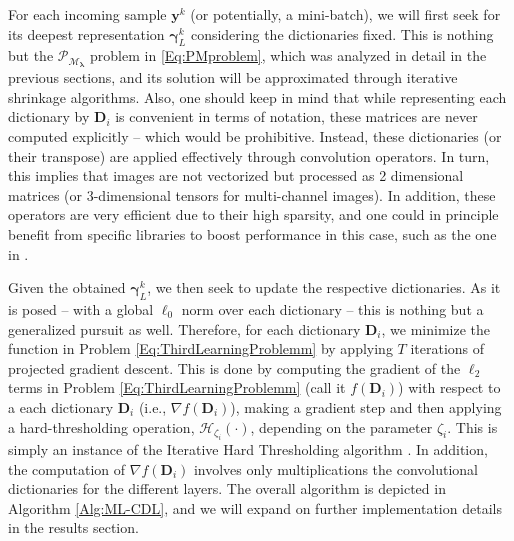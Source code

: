 \documentclass[10pt,journal]{IEEEtran}
\def\y{{\mathbf y}}
\def\D{{\mathbf D}}
\def\M{{\mathcal{M}}}
\def\P{{\mathcal{P}}}
\def\S{{\mathcal{S}}}
\def\gama{{\boldsymbol \gamma}}
\def\lamda{{\boldsymbol \lambda}}
\def\PM{{\P_{\M_\lamda}}}
\theoremstyle{plain}
\theoremstyle{definition}
\begin{document}
For each incoming sample $\y^k$ (or potentially, a mini-batch), we will first seek for its deepest representation $\gama^k_L$ considering the dictionaries fixed. This is nothing but the $\PM$ problem in \eqref{Eq:PMproblem}, which was analyzed in detail in the previous sections, and its solution will be approximated through iterative shrinkage algorithms. Also, one should keep in mind that while representing each dictionary by $\D_i$ is convenient in terms of notation, these matrices are never computed explicitly -- which would be prohibitive. Instead, these dictionaries (or their transpose) are applied effectively through convolution operators. In turn, this implies that images are not vectorized but processed as 2 dimensional matrices (or 3-dimensional tensors for multi-channel images). In addition, these operators are very efficient due to their high sparsity, and one could in principle benefit from specific libraries to boost performance in this case, such as the one in \cite{liu2015sparse}.

Given the obtained $\gama^k_L$, we then seek to update the respective dictionaries. As it is posed -- with a global $\ell_0$ norm over each dictionary -- this is nothing but a generalized pursuit as well. Therefore, for each dictionary $\D_i$, we minimize the function in Problem \eqref{Eq:ThirdLearningProblemm} by applying $T$ iterations of projected gradient descent. 
This is done by computing the gradient of the $\ell_2$ terms in Problem \eqref{Eq:ThirdLearningProblemm} (call it $f(\D_i)$) with respect to a each dictionary $\D_i$ (i.e., $\nabla f(\D_i)$), making a gradient step and then applying a hard-thresholding operation, $\mathcal{H}_{\zeta_i}(\cdot)$, depending on the parameter $\zeta_i$. This is simply an instance of the Iterative Hard Thresholding algorithm \cite{Blumensath2008}.
In addition, the computation of $\nabla f(\D_i)$ involves only multiplications the convolutional dictionaries for the different layers. The overall algorithm is depicted in Algorithm \ref{Alg:ML-CDL}, and we will expand on further implementation details in the results section.
\end{document}
